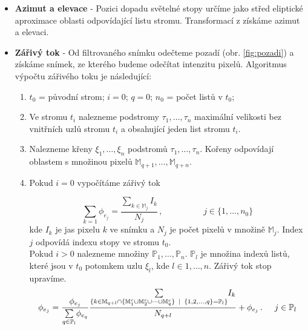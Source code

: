\begin{itemize}
	\item \textbf{Azimut a elevace} - Pozici dopadu světelné stopy určíme jako střed eliptické aproximace oblasti odpovídající listu stromu. Transformací z \cite{Drapela} získáme azimut a elevaci.
	
	\item \textbf{Zářivý tok} - 
	Od filtrovaného snímku odečteme pozadí (obr. \ref{fig:pozadi}) a získáme snímek, ze kterého budeme odečítat intenzitu pixelů. Algoritmus výpočtu zářivého toku je následující:
	\begin{enumerate}
	\item $t_0$ = původní strom; $i = 0$; $q = 0$; $n_0$ = počet listů v $t_0$;
	
	\item Ve stromu $t_i$ nalezneme podstromy $\tau_1,\dots,\tau_n$ maximální velikosti bez vnitřních uzlů stromu $t_i$ a obsahující jeden list stromu $t_i$.  
	
	\item Nalezneme křeny $\xi_1,\dots,\xi_n$ podstromů $\tau_1,\dots,\tau_n$. Kořeny odpovídají oblastem s množinou pixelů $\mathbb{M}_{q+1},\dots,\mathbb{M}_{q+n}$.
	
	\item Pokud $i = 0$ vypočítáme zářivý tok 
	
	\begin{equation}
	\underset{{k = 1}}{\sum}
	\phi_{e_j} = \frac{\underset{k\in\mathbb{M}_j}{\sum}I_k}{N_j}\,,\hspace{2cm} j\in\lbrace1,\dots,n_0\rbrace
	\end{equation}
	kde $I_k$ je jas pixelu $k$ ve snímku a $N_j$ je počet pixelů v množině $\mathbb{M}_j$. Index $j$ odpovídá indexu stopy ve stromu $t_0$.\\
	
	Pokud $i > 0$ nalezneme množiny $\mathbb{P}_1,\dots,\mathbb{P}_n$. $\mathbb{P}_l$ je množina indexů listů, které jsou v $t_0$ potomkem uzlu $\xi_l$, kde $l\in {1,\dots,n}$. Zářivý tok stop upravíme.  
	 \begin{equation}
	\phi_{e_j} = \frac{\phi_{e_j}}{\underset{q\in \mathbb{P}_l}{\sum}\phi_{e_q}}\frac{\underset{{\lbrace k\in\mathbb{M}_{q+l}\cap\lbrace \mathbb{M}_1^c \cup \mathbb{M}_2^c \cup \dots \cup \mathbb{M}_q^c \rbrace\hspace{1.5mm}|\hspace{1.5mm} \lbrace1,2,\dots,q\rbrace = \mathbb{P}_l \rbrace}}{\sum} I_k}{N_{q+l}} + \phi_{e_j}\,.\hspace{0.5cm} j\in \mathbb{P}_l
	\end{equation}
	

\end{enumerate}
\end{itemize}
